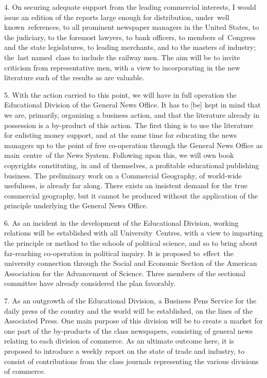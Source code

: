 \documentclass[twoside,symmetric,nobib,justified]{tufte-book}
\begin{document}
\enlargethispage{\baselineskip}

4. On securing adequate support from the leading commercial interests, I
would issue an edition of the reports large enough for distribution,
under~well known~references, to all prominent newspaper managers in the
United States, to the judiciary, to the foremost lawyers, to bank
officers, to members of~Congress and the state legislatures, to leading
merchants, and to the masters of industry; the~last named~class to
include the railway men. The aim will be to invite criticism from
representative men, with a view to incorporating in the new literature
such of the results as are valuable.~

5. With the action carried to this point, we will have in full operation
the Educational Division of the General News Office. It has to {[}be{]}
kept in mind that we are, primarily, organizing a business action, and
that the literature already in possession is a by-product of this
action. The first thing is to use the literature for enlisting money
support, and at the same time for educating the news managers up to the
point of free co-operation through the General News Office as
main~centre~of the News System. Following upon this, we will own book
copyrights constituting, in and of themselves, a profitable educational
publishing business. The preliminary work on a Commercial Geography, of
world-wide usefulness, is already far along. There exists an insistent
demand for the true commercial geography, but it cannot be produced
without the application of the principle underlying the General News
Office.~

6. As an incident in the development of the Educational Division,
working relations will be established with all University~Centres, with
a view to imparting the principle or method to the schools of political
science, and so to bring about far-reaching co-operation in political
inquiry. It is proposed to~effect~the university connection through the
Social and Economic Section of the American Association for the
Advancement of Science. Three members of the sectional committee have
already considered the plan favorably.~

7. As an outgrowth of the Educational Division, a Business Pens Service
for the daily press of the country and the world will be established, on
the lines of the Associated Press. One main purpose of this division
will be to create a market for one part of the by-products of the class
newspapers, consisting of general news relating to each division of
commerce. As an ultimate outcome here, it is proposed to introduce a
weekly report on the state of trade and industry, to consist of
contributions from the class journals representing the various divisions
of commerce.~
\end{document}
